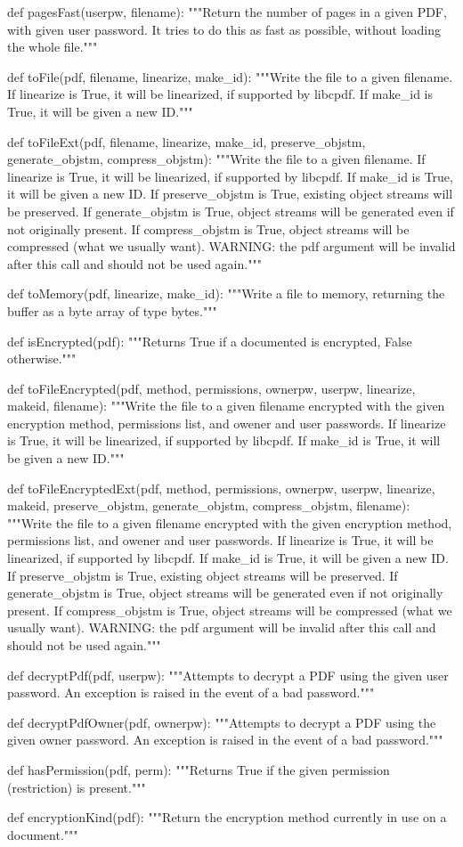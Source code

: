 def pagesFast(userpw, filename):
    """Return the number of pages in a given
    PDF, with given user password. It tries to do this as fast as
    possible, without loading the whole file."""

def toFile(pdf, filename, linearize, make_id):
    """Write the file to a given filename. If linearize is True, it will be
    linearized, if supported by libcpdf. If make_id is True, it will be given a
    new ID."""

def toFileExt(pdf, filename, linearize, make_id, preserve_objstm,
              generate_objstm, compress_objstm):
    """Write the file to a given filename. If linearize is True, it will be
    linearized, if supported by libcpdf. If make_id is True, it will be given a
    new ID.  If preserve_objstm is True, existing object streams will be
    preserved. If generate_objstm is True, object streams will be generated
    even if not originally present. If compress_objstm is True, object streams
    will be compressed (what we usually want). WARNING: the pdf argument will
    be invalid after this call and should not be used again."""

def toMemory(pdf, linearize, make_id):
    """Write a file to memory, returning the buffer as a byte array of type
    bytes."""

def isEncrypted(pdf):
    """Returns True if a documented is encrypted, False otherwise."""

def toFileEncrypted(pdf, method, permissions, ownerpw, userpw, linearize,
                    makeid, filename):
    """Write the file to a given filename encrypted with the given encryption
    method, permissions list, and owener and user passwords. If linearize is
    True, it will be linearized, if supported by libcpdf. If make_id is True,
    it will be given a new ID."""

def toFileEncryptedExt(pdf, method, permissions, ownerpw, userpw, linearize,
                       makeid, preserve_objstm, generate_objstm,
                       compress_objstm, filename):
    """Write the file to a given filename encrypted with the given encryption
    method, permissions list, and owener and user passwords. If linearize is
    True, it will be linearized, if supported by libcpdf. If make_id is True,
    it will be given a new ID. If preserve_objstm is True, existing object
    streams will be preserved. If generate_objstm is True, object streams will
    be generated even if not originally present. If compress_objstm is True,
    object streams will be compressed (what we usually want). WARNING: the pdf
    argument will be invalid after this call and should not be used again."""

def decryptPdf(pdf, userpw):
    """Attempts to decrypt a PDF using the given user password. An exception is
    raised in the event of a bad password."""

def decryptPdfOwner(pdf, ownerpw):
    """Attempts to decrypt a PDF using the given owner password. An exception
    is raised in the event of a bad password."""

def hasPermission(pdf, perm):
    """Returns True if the given permission (restriction) is present."""

def encryptionKind(pdf):
    """Return the encryption method currently in use on a document."""
